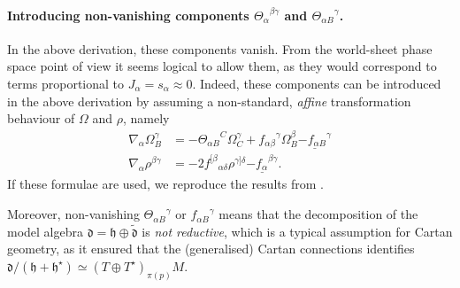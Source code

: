 \documentclass[11pt,a4paper]{article}
\numberwithin{equation}{section}
\begin{document}
\paragraph{Introducing non-vanishing components ${\Theta_{\alpha}}^{\beta \gamma}$ and ${\Theta_{\alpha B}}^\gamma$. } In the above derivation, these components vanish. From the world-sheet phase space point of view it seems logical to allow them, as they would correspond to terms proportional to $J_\alpha = s_\alpha \approx 0$. Indeed, these components can be introduced in the above derivation by assuming a non-standard, \textit{affine} transformation behaviour of $\Omega$ and $\rho$, namely
\begin{align}\label{eq:shiftOmega}
	\nabla_\alpha \Omega_B^\gamma &= - {\Theta_{\alpha B}}^C \Omega_C^\gamma + {f_{\alpha \beta }}^\gamma \Omega_B^\beta  \underline{- {f_{\alpha B}}^\gamma } \\ \label{eq:shiftRho}
	\nabla_\alpha \rho^{\beta\gamma} &= - 2 {f^{[\beta}}_{\alpha \delta} \rho^{\gamma] \delta } \underline{ - {f_{\alpha}}^{\beta \gamma} }.
\end{align}
If these formulae are used, we reproduce the results from \cite{Butter:2021dtu,Butter:2022iza}.

Moreover, non-vanishing ${\Theta_{\alpha B}}^\gamma$ or ${f_{\alpha B}}^\gamma$ means that the decomposition of the model algebra $\mathfrak{d} = \mathfrak{h} \oplus \tilde{\mathfrak{d}}$ is \textit{not reductive}, which is a typical assumption for Cartan geometry, as it ensured that the (generalised) Cartan connections identifies $\mathfrak{d}/(\mathfrak{h} + \mathfrak{h}^\star) \simeq (T \oplus T^\star)_{\pi(p)} M$.
\end{document}
